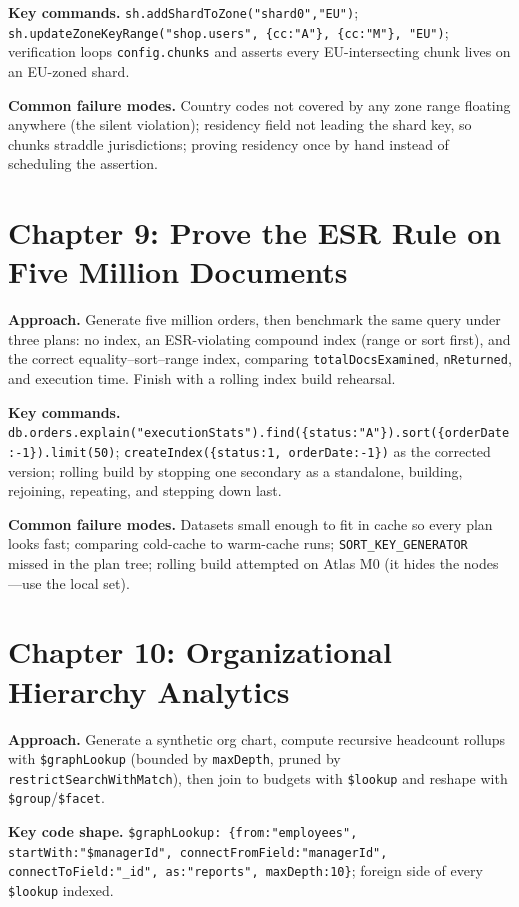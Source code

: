 \textbf{Key commands.} \texttt{sh.addShardToZone("shard0","EU")};
\texttt{sh.updateZoneKeyRange("shop.users", \{cc:"A"\}, \{cc:"M"\}, "EU")}; verification loops
\texttt{config.chunks} and asserts every EU-intersecting chunk lives on an EU-zoned shard.

\textbf{Common failure modes.} Country codes not covered by any zone range floating anywhere
(the silent violation); residency field not leading the shard key, so chunks straddle
jurisdictions; proving residency once by hand instead of scheduling the assertion.

\section{Chapter 9: Prove the ESR Rule on Five Million Documents}
\textbf{Approach.} Generate five million orders, then benchmark the same query under three
plans: no index, an ESR-violating compound index (range or sort first), and the correct
equality--sort--range index, comparing \texttt{totalDocsExamined}, \texttt{nReturned}, and
execution time. Finish with a rolling index build rehearsal.

\textbf{Key commands.} \texttt{db.orders.explain("executionStats").find(\{status:"A"\}).sort(\{orderDate:-1\}).limit(50)};
\texttt{createIndex(\{status:1, orderDate:-1\})} as the corrected version; rolling build by
stopping one secondary as a standalone, building, rejoining, repeating, and stepping down last.

\textbf{Common failure modes.} Datasets small enough to fit in cache so every plan looks fast;
comparing cold-cache to warm-cache runs; \texttt{SORT\_KEY\_GENERATOR} missed in the plan tree;
rolling build attempted on Atlas M0 (it hides the nodes---use the local set).

\section{Chapter 10: Organizational Hierarchy Analytics}
\textbf{Approach.} Generate a synthetic org chart, compute recursive headcount rollups with
\texttt{\$graphLookup} (bounded by \texttt{maxDepth}, pruned by
\texttt{restrictSearchWithMatch}), then join to budgets with \texttt{\$lookup} and reshape with
\texttt{\$group}/\texttt{\$facet}.

\textbf{Key code shape.} \texttt{\$graphLookup: \{from:"employees", startWith:"\$managerId",
connectFromField:"managerId", connectToField:"\_id", as:"reports", maxDepth:10\}}; foreign side
of every \texttt{\$lookup} indexed.

